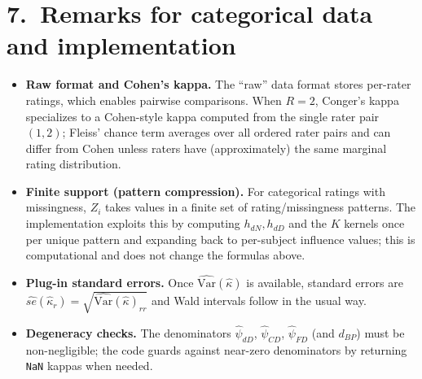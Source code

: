 \documentclass[11pt]{article}
\begin{document}
\section*{7.\ Remarks for categorical data and implementation}

\begin{itemize}
\item \textbf{Raw format and Cohen's kappa.} The ``raw'' data format stores
  per-rater ratings, which enables pairwise comparisons. When $R=2$, Conger's
  kappa specializes to a Cohen-style kappa computed from the single rater pair
  $(1,2)$; Fleiss' chance term averages over all ordered rater pairs and can
  differ from Cohen unless raters have (approximately) the same marginal rating
  distribution.
\item \textbf{Finite support (pattern compression).} For categorical ratings with
  missingness, $Z_i$ takes values in a finite set of rating/missingness patterns.
  The implementation exploits this by computing $h_{dN},h_{dD}$ and the $K$
  kernels once per unique pattern and expanding back to per-subject influence
  values; this is computational and does not change the formulas above.
\item \textbf{Plug-in standard errors.} Once $\widehat{\mathrm{Var}}(\hat\kappa)$
  is available, standard errors are $\widehat{se}(\hat\kappa_r)=\sqrt{\widehat{\mathrm{Var}}(\hat\kappa)_{rr}}$
  and Wald intervals follow in the usual way.
\item \textbf{Degeneracy checks.} The denominators $\hat\psi_{dD}$, $\hat\psi_{CD}$,
  $\hat\psi_{FD}$ (and $d_{BP}$) must be non-negligible; the code guards against
  near-zero denominators by returning \texttt{NaN} kappas when needed.
\end{itemize}
\end{document}
